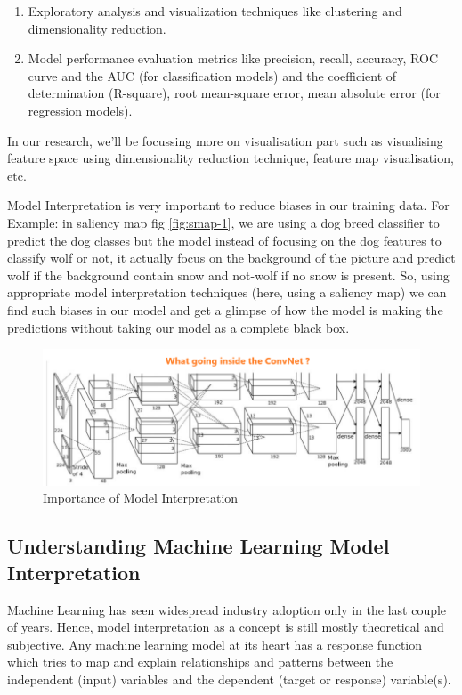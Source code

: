 \begin{enumerate}
    \item Exploratory analysis and visualization techniques like clustering and dimensionality reduction.
    \item Model performance evaluation metrics like precision, recall, accuracy, ROC curve and the AUC (for classification models) and the coefficient of determination (R-square), root mean-square error, mean absolute error (for regression models).
\end{enumerate}

In our research, we'll be focussing more on visualisation part such as visualising feature space using dimensionality reduction technique, feature map visualisation, etc.  \par\vspace{1em}

Model Interpretation is very important to reduce biases in our training data. For Example: in saliency map fig \ref{fig:smap-1}, we are using a dog breed classifier to predict the dog classes but the model instead of focusing on the dog features to classify wolf or not, it actually focus on the background of the picture and predict wolf if the background contain snow and not-wolf if no snow is present. So, using appropriate model interpretation techniques (here, using a saliency map) we can find such biases in our model and get a glimpse of how the model is making the predictions without taking our model as a complete black box.\par\vspace{1em}


\begin{figure}
    \centering
    \includegraphics[width=\linewidth]{graphics/chapter6/model interpretation.png}
    \caption{Importance of Model Interpretation}
    \label{fig:model-interpretationj}
\end{figure}

\subsection{Understanding Machine Learning Model Interpretation}
    Machine Learning has seen widespread industry adoption only in the last couple of years. Hence, model interpretation as a concept is still mostly theoretical and subjective. Any machine learning model at its heart has a response function which tries to map and explain relationships and patterns between the independent (input) variables and the dependent (target or response) variable(s). \par\vspace{1em}

